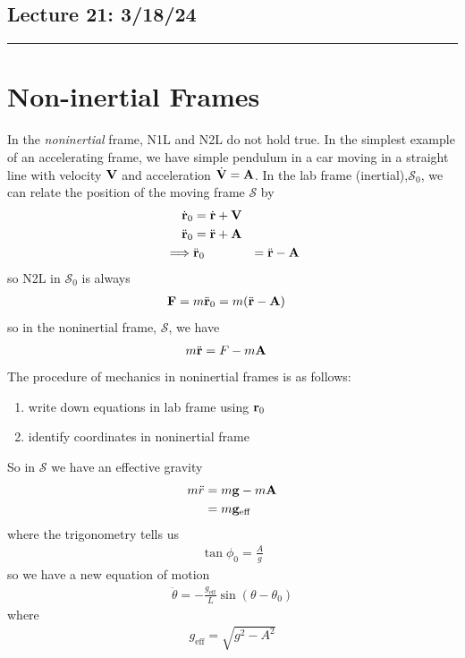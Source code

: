 \documentclass[../main.tex]{subfiles}
\begin{document}
\subsection*{Lecture 21: \hfill  3/18/24}
\hrule \vspace{10px}
\section*{Non-inertial Frames}
In the \emph{noninertial} frame, N1L and N2L do not hold true. In the simplest example of an
accelerating frame, we have simple pendulum in a car moving in a straight line with velocity $\vb V$ and acceleration
$\dot{\vb V} = \vb A$. In the lab frame (inertial),$\mathcal{S}_0$, we can relate the position of the
moving frame $\mathcal{S}$ by
\begin{align*}
    \dot{\vb r}_0 &= \dot{\vb r} + \vb V \\ 
    \ddot{\vb r}_0 &= \ddot{\vb r} + \vb A \\
    \implies &\ddot{\vb r}_0 &= \ddot{\vb r} - \vb A
\end{align*}
so N2L in $\mathcal{S}_0$ is always
\begin{align*}
    \vb F &= m \ddot{\vb r}_0 = m (\ddot{\vb r} - \vb A)
\end{align*}
so in the noninertial frame, $\mathcal{S}$, we have
\begin{align*}
    m\ddot{\vb r} &= F - m\vb A
\end{align*}
The procedure of mechanics in noninertial frames is as follows:
\begin{enumerate}
    \item write down equations in lab frame using $\vb r_0$
    \item identify coordinates in noninertial frame
\end{enumerate}
So in $\mathcal{S}$ we have an effective gravity
\begin{align*}
    m\ddot{r} &= m\vb g - m \vb A \\
    &= m \vb g_{\text{eff}}
\end{align*}
where the trigonometry tells us
\begin{align*}
    \tan\phi_0 = \frac{A}{g}
\end{align*}
so we have a new equation of motion
\begin{align*}
    \ddot \theta = -\frac{g_{\text{eff}}}{L} \sin(\theta - \theta_0)
\end{align*}
where
\begin{align*}
    g_{\text{eff}} = \sqrt{g^2 - A^2}
\end{align*}
\end{document}
